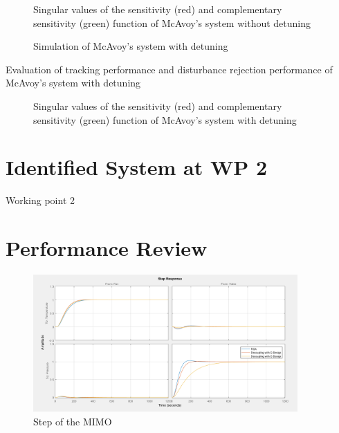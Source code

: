 \begin{figure}[H]\centering

\caption{Singular values of the sensitivity (red) and complementary sensitivity (green) function of  McAvoy's system without detuning}
\label{c:fotd:s:mcavoy:f:SingValNotDetuned}
\end{figure}

\begin{figure}[H]\centering

\caption{Simulation of McAvoy's system with detuning}
\label{c:fotd:s:mcavoy:f:SimDetuned}
\end{figure}

\begin{table}[H]
\centering
\caption{Evaluation of tracking performance and disturbance rejection performance of McAvoy's system with detuning}
\label{c:fotd:s:mcavoy:tab:eval1}

\end{table}

\begin{figure}[H]\centering

\caption{Singular values of the sensitivity (red) and complementary sensitivity (green) function of  McAvoy's system with detuning}
\label{c:fotd:s:mcavoy:f:SingValDetuned}
\end{figure}

\section{Identified System at WP 2}%
\label{c:fotd:s:wp1}

Working point 2

\section{Performance Review} %
\label{c:fotd:s:performance_review}

\begin{figure}[H]
\begin{minipage}[b]{\textwidth}
\centering
\includegraphics[width=0.9\textwidth]{./Graphics/Step_MATLAB.png}
\caption{Step of the MIMO}
\label{c:fotd:f:mimo_step}
\end{minipage}
\end{figure}


